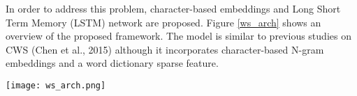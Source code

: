 \documentclass[11pt,letterpaper]{article}
\begin{document}
In order to address this problem, character-based embeddings and Long Short Term Memory (LSTM) network are proposed.
Figure \ref{ws_arch} shows an overview of the proposed framework. The model is similar to previous studies on CWS (Chen et al., 2015) although it incorporates character-based N-gram embeddings and a word dictionary sparse feature. 
 
 \begin{figure*}[t]    
 \begin{center}    
 \texttt{[image: ws\_arch.png]}              
 \caption{An overview of the proposed LSTM for Japanese word segmentation.}    
 \label{ws_arch}    
\end{center}    
\end{figure*}


 
\end{document}
